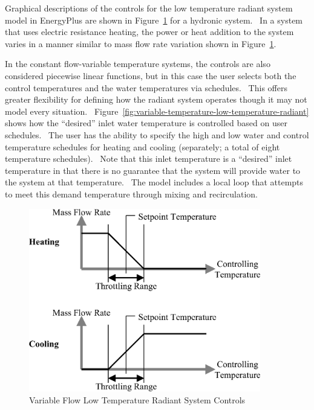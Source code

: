 Graphical descriptions of the controls for the low temperature radiant system model in EnergyPlus are shown in Figure~\ref{fig:variable-flow-low-temperature-radiant-system} for a hydronic system.~ In a system that uses electric resistance heating, the power or heat addition to the system varies in a manner similar to mass flow rate variation shown in Figure~\ref{fig:variable-flow-low-temperature-radiant-system}.

In the constant flow-variable temperature systems, the controls are also considered piecewise linear functions, but in this case the user selects both the control temperatures and the water temperatures via schedules.~ This offers greater flexibility for defining how the radiant system operates though it may not model every situation.~ Figure~\ref{fig:variable-temperature-low-temperature-radiant} shows how the ``desired'' inlet water temperature is controlled based on user schedules.~ The user has the ability to specify the high and low water and control temperature schedules for heating and cooling (separately; a total of eight temperature schedules).~ Note that this inlet temperature is a ``desired'' inlet temperature in that there is no guarantee that the system will provide water to the system at that temperature.~ The model includes a local loop that attempts to meet this demand temperature through mixing and recirculation.

\begin{figure}[hbtp] %
\centering
\includegraphics[width=0.9\textwidth, height=0.9\textheight, keepaspectratio=true]{media/image6053.png}
\caption{Variable Flow Low Temperature Radiant System Controls \protect \label{fig:variable-flow-low-temperature-radiant-system}}
\end{figure}


